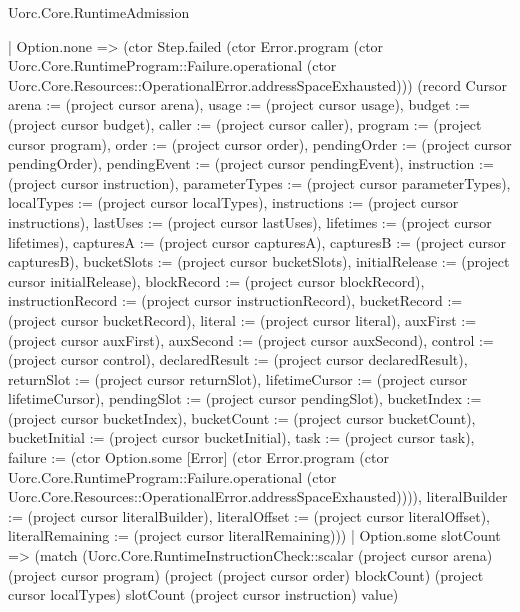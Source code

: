 \begin{lexlean}{Uorc.Core.RuntimeAdmission}
\begin{semanticmodule}
{            | Option.none => (ctor Step.failed (ctor Error.program (ctor Uorc.Core.RuntimeProgram::Failure.operational (ctor Uorc.Core.Resources::OperationalError.addressSpaceExhausted))) (record Cursor {arena := (project cursor arena), usage := (project cursor usage), budget := (project cursor budget), caller := (project cursor caller), program := (project cursor program), order := (project cursor order), pendingOrder := (project cursor pendingOrder), pendingEvent := (project cursor pendingEvent), instruction := (project cursor instruction), parameterTypes := (project cursor parameterTypes), localTypes := (project cursor localTypes), instructions := (project cursor instructions), lastUses := (project cursor lastUses), lifetimes := (project cursor lifetimes), capturesA := (project cursor capturesA), capturesB := (project cursor capturesB), bucketSlots := (project cursor bucketSlots), initialRelease := (project cursor initialRelease), blockRecord := (project cursor blockRecord), instructionRecord := (project cursor instructionRecord), bucketRecord := (project cursor bucketRecord), literal := (project cursor literal), auxFirst := (project cursor auxFirst), auxSecond := (project cursor auxSecond), control := (project cursor control), declaredResult := (project cursor declaredResult), returnSlot := (project cursor returnSlot), lifetimeCursor := (project cursor lifetimeCursor), pendingSlot := (project cursor pendingSlot), bucketIndex := (project cursor bucketIndex), bucketCount := (project cursor bucketCount), bucketInitial := (project cursor bucketInitial), task := (project cursor task), failure := (ctor Option.some [Error] (ctor Error.program (ctor Uorc.Core.RuntimeProgram::Failure.operational (ctor Uorc.Core.Resources::OperationalError.addressSpaceExhausted)))), literalBuilder := (project cursor literalBuilder), literalOffset := (project cursor literalOffset), literalRemaining := (project cursor literalRemaining)}))
            | Option.some slotCount => (match (Uorc.Core.RuntimeInstructionCheck::scalar (project cursor arena) (project cursor program) (project (project cursor order) blockCount) (project cursor localTypes) slotCount (project cursor instruction) value)
}
\end{semanticmodule}
\end{lexlean}
